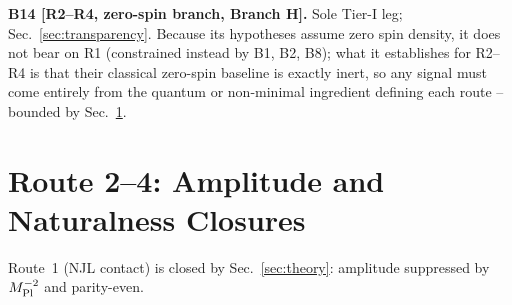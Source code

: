 \documentclass[aps,prd,twocolumn,superscriptaddress,preprintnumbers,nofootinbib,longbibliography,floatfix]{revtex4-2}
\newcommand{\MPl}{M_{\rm Pl}}
\begin{document}
\medskip\noindent\textbf{B14 [R2--R4, zero-spin branch, Branch H].} Sole
Tier-I leg; Sec.~\ref{sec:transparency}. Because its hypotheses assume
zero spin density, it does not bear on R1 (constrained instead by B1,
B2, B8); what it establishes for R2--R4 is that their classical
zero-spin baseline is exactly inert, so any signal must come entirely
from the quantum or non-minimal ingredient defining each route --
bounded by Sec.~\ref{sec:routes}.

\section{Route 2--4: Amplitude and Naturalness Closures}\label{sec:routes}

Route~1 (NJL contact) is closed by Sec.~\ref{sec:theory}: amplitude
suppressed by $\MPl^{-2}$ and parity-even.
\end{document}
